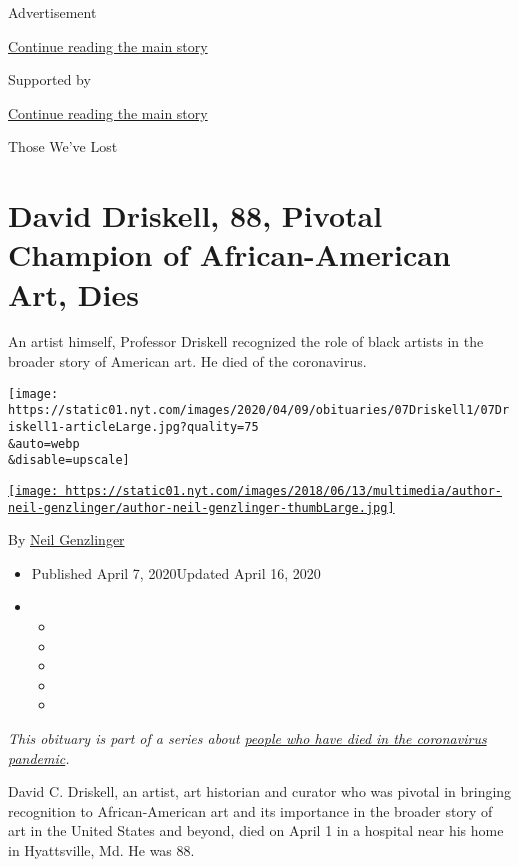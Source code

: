 Advertisement

\protect\hyperlink{after-top}{Continue reading the main story}

Supported by

\protect\hyperlink{after-sponsor}{Continue reading the main story}

Those We've Lost

\hypertarget{david-driskell-88-pivotal-champion-of-african-american-art-dies}{%
\section{David Driskell, 88, Pivotal Champion of African-American Art,
Dies}\label{david-driskell-88-pivotal-champion-of-african-american-art-dies}}

An artist himself, Professor Driskell recognized the role of black
artists in the broader story of American art. He died of the
coronavirus.

\texttt{[image: https://static01.nyt.com/images/2020/04/09/obituaries/07Driskell1/07Driskell1-articleLarge.jpg?quality=75\\\&auto=webp\\\&disable=upscale]}

\href{https://www.nytimes.com/by/neil-genzlinger}{\texttt{[image: https://static01.nyt.com/images/2018/06/13/multimedia/author-neil-genzlinger/author-neil-genzlinger-thumbLarge.jpg]}}

By \href{https://www.nytimes.com/by/neil-genzlinger}{Neil Genzlinger}

\begin{itemize}
\item
  Published April 7, 2020Updated April 16, 2020
\item
  \begin{itemize}
  \item
  \item
  \item
  \item
  \item
  \end{itemize}
\end{itemize}

\emph{This obituary is part of a series about}
\href{https://www.nytimes.com/series/people-who-have-died-of-the-coronavirus}{\emph{people
who have died in the coronavirus pandemic}}\emph{.}

David C. Driskell, an artist, art historian and curator who was pivotal
in bringing recognition to African-American art and its importance in
the broader story of art in the United States and beyond, died on April
1 in a hospital near his home in Hyattsville, Md. He was 88.

